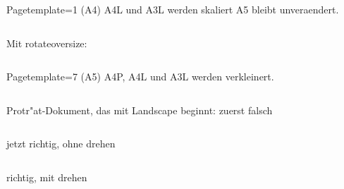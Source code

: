 \documentclass[a4paper]{article}
\begin{document}
\Large

Pagetemplate=1 (A4) \textrightarrow A4L und A3L werden skaliert
   A5 bleibt unveraendert.
\begin{verbatim}

\end{verbatim}


Mit rotateoversize:
\begin{verbatim}

\end{verbatim}


Pagetemplate=7 (A5) \textrightarrow A4P, A4L und A3L werden verkleinert.
\begin{verbatim}

\end{verbatim}


Protr"at-Dokument, das mit Landscape beginnt: zuerst falsch
\begin{verbatim}

\end{verbatim}


jetzt richtig, ohne drehen
\begin{verbatim}

\end{verbatim}


richtig, mit drehen
\begin{verbatim}

\end{verbatim}

\end{document}
